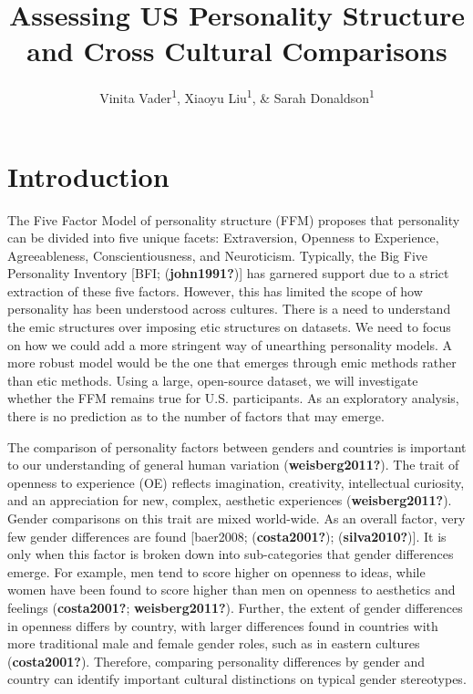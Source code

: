 \documentclass[
  english,
  man, fleqn, noextraspace]{apa6}
\title{Assessing US Personality Structure and Cross Cultural Comparisons}
\author{Vinita Vader\textsuperscript{1}, Xiaoyu Liu\textsuperscript{1}, \& Sarah Donaldson\textsuperscript{1}}
\date{}
\affiliation{\vspace{0.5cm}\textsuperscript{1} University of Oregon}
\begin{document}
\maketitle

\hypertarget{introduction}{%
\section{Introduction}\label{introduction}}

The Five Factor Model of personality structure (FFM) proposes that personality can be divided into five unique facets: Extraversion, Openness to Experience, Agreeableness, Conscientiousness, and Neuroticism. Typically, the Big Five Personality Inventory {[}BFI; (\textbf{john1991?}){]} has garnered support due to a strict extraction of these five factors. However, this has limited the scope of how personality has been understood across cultures. There is a need to understand the emic structures over imposing etic structures on datasets. We need to focus on how we could add a more stringent way of unearthing personality models. A more robust model would be the one that emerges through emic methods rather than etic methods. Using a large, open-source dataset, we will investigate whether the FFM remains true for U.S. participants. As an exploratory analysis, there is no prediction as to the number of factors that may emerge.

The comparison of personality factors between genders and countries is important to our understanding of general human variation (\textbf{weisberg2011?}). The trait of openness to experience (OE) reflects imagination, creativity, intellectual curiosity, and an appreciation for new, complex, aesthetic experiences (\textbf{weisberg2011?}). Gender comparisons on this trait are mixed world-wide. As an overall factor, very few gender differences are found {[}baer2008; (\textbf{costa2001?}); (\textbf{silva2010?}){]}. It is only when this factor is broken down into sub-categories that gender differences emerge. For example, men tend to score higher on openness to ideas, while women have been found to score higher than men on openness to aesthetics and feelings (\textbf{costa2001?}; \textbf{weisberg2011?}). Further, the extent of gender differences in openness differs by country, with larger differences found in countries with more traditional male and female gender roles, such as in eastern cultures (\textbf{costa2001?}). Therefore, comparing personality differences by gender and country can identify important cultural distinctions on typical gender stereotypes.
\end{document}
